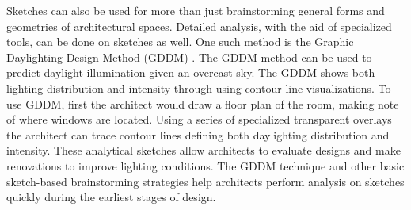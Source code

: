 
Sketches can also be used for more than just brainstorming general forms and geometries of architectural spaces. 
Detailed analysis, with the aid of specialized tools, can be done on sketches as well.
One such method is the Graphic Daylighting Design Method (GDDM) \cite{millet1980graphic,moore}.
The GDDM method can be used to predict daylight illumination given an overcast sky.
The GDDM shows both lighting distribution and intensity through using contour line visualizations.
To use GDDM, first the architect would draw a floor plan of the room, making note of where windows are located.
Using a series of specialized transparent overlays the architect can trace contour lines defining both daylighting distribution and intensity.
These analytical sketches allow architects to evaluate designs and make renovations to improve lighting conditions.
The GDDM technique and other basic sketch-based brainstorming strategies help architects perform analysis on sketches quickly during the earliest stages of design.\\



